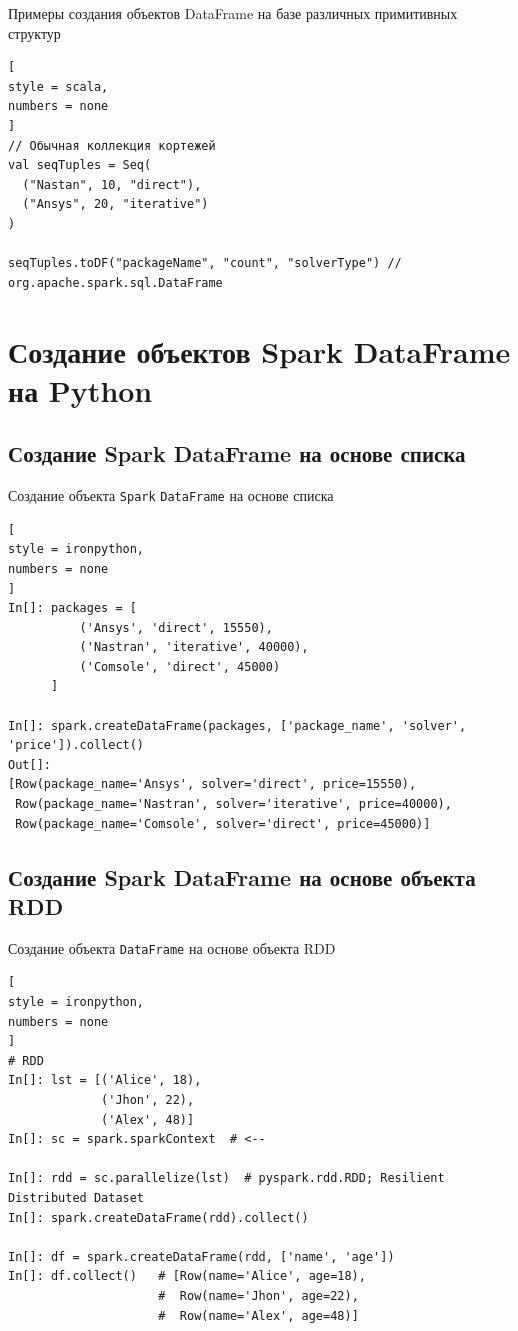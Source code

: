 \documentclass[%
	11pt,
	a4paper,
	utf8,
		]{article}
\begin{document}
Примеры создания объектов DataFrame на базе различных примитивных структур
\begin{lstlisting}[
style = scala,
numbers = none	
]
// Обычная коллекция кортежей
val seqTuples = Seq(
  ("Nastan", 10, "direct"),
  ("Ansys", 20, "iterative")
)

seqTuples.toDF("packageName", "count", "solverType") // org.apache.spark.sql.DataFrame
\end{lstlisting}


\section{Создание объектов Spark DataFrame на Python}

\subsection{Создание Spark DataFrame на основе списка}

Создание объекта \texttt{Spark} \texttt{DataFrame} на основе списка

\begin{lstlisting}[
style = ironpython,
numbers = none
]
In[]: packages = [
          ('Ansys', 'direct', 15550),
          ('Nastran', 'iterative', 40000),
          ('Comsole', 'direct', 45000)
      ]

In[]: spark.createDataFrame(packages, ['package_name', 'solver', 'price']).collect()
Out[]:
[Row(package_name='Ansys', solver='direct', price=15550),
 Row(package_name='Nastran', solver='iterative', price=40000),
 Row(package_name='Comsole', solver='direct', price=45000)]
\end{lstlisting}

\subsection{Создание Spark DataFrame на основе объекта RDD}

Создание объекта \texttt{DataFrame} на основе объекта RDD

\begin{lstlisting}[
style = ironpython,
numbers = none
]
# RDD
In[]: lst = [('Alice', 18),
             ('Jhon', 22),
             ('Alex', 48)]
In[]: sc = spark.sparkContext  # <--

In[]: rdd = sc.parallelize(lst)  # pyspark.rdd.RDD; Resilient Distributed Dataset
In[]: spark.createDataFrame(rdd).collect()

In[]: df = spark.createDataFrame(rdd, ['name', 'age'])
In[]: df.collect()   # [Row(name='Alice', age=18),
                     #  Row(name='Jhon', age=22),
                     #  Row(name='Alex', age=48)]
\end{lstlisting}
\end{document}
